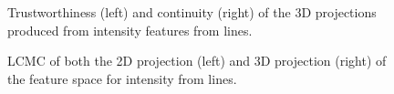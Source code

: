\begin{figure}[H]
	\centering
	\caption{Trustworthiness (left) and continuity (right) of the 3D projections produced from intensity features from lines.}\label{fig:TC_3d_intensity}
\end{figure}

\begin{figure}[H]
	\centering
	\caption{LCMC of both the 2D projection (left) and 3D projection (right) of the feature space for intensity from lines.}\label{fig:LCMC_intensity}
\end{figure}
\clearpage


